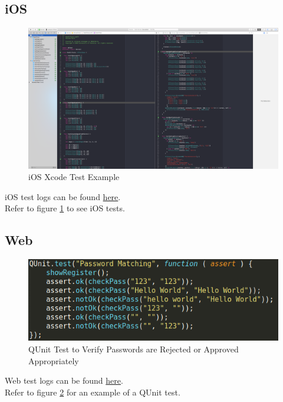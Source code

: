 \documentclass[12pt]{article}
\begin{document}
\subsection{iOS}
	\begin{figure}
  	\includegraphics[width=\textwidth]{images/iosexample.png}
	\caption{iOS Xcode Test Example}
	\label{fig:ie}
  \end{figure}
iOS test logs can be found \href{https://github.com/BinaryNinjaz/COS301-Capstone/tree/master/Source/iOS/Harvest/TestResults}{here}.\\
\indent Refer to figure \ref{fig:ie} to see iOS tests.
\subsection{Web}
	\begin{figure}
  	\includegraphics[width=\textwidth]{images/qt.png}
	\caption{QUnit Test to Verify Passwords are Rejected or Approved Appropriately}
	\label{fig:qt}
  \end{figure}
Web test logs can be found \href{https://github.com/BinaryNinjaz/COS301-Capstone/tree/master/Source/Web/test-logs}{here}.\\
\indent Refer to figure \ref{fig:qt} for an example of a QUnit test.
  
\end{document}
